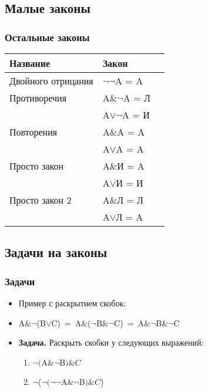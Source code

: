 \documentclass[compress,red]{beamer}
\begin{document}
\subsection{Малые законы}
\begin{frame}[fragile]
  \frametitle{Остальные законы}
  \begin{center}
  \begin{tabular}{|l|l|l|}
    \hline
    Название & Закон \\
    \hline
    Двойного отрицания & ${\neg{\neg}}$A = A \\ 
    \hline
    Противоречия & A$\&{\neg}$A = Л \\
                  & A$\vee{\neg}$A = И \\
    \hline
    Повторения & A$\&$A = A \\
               & A$\vee$A = A \\
    \hline
    Просто закон & A$\&$И = A \\
              & A$\vee$И = И \\
    \hline
    Просто закон 2 & A$\&$Л = Л \\
              & A$\vee$Л = A \\
    \hline
  \end{tabular}
  \end{center}
\end{frame}

\subsection{Задачи на законы}
\begin{frame}[fragile]
  \frametitle{Задачи}
  \begin{itemize}
    \item Пример с раскрытием скобок: 
    \item A$\&{\neg}$(B$\vee$C)~=~A$\&$(${\neg}$B$\&$${\neg}$C)~=~A$\&{\neg}$B$\&$${\neg}$C
    \item \textbf{Задача.} Раскрыть скобки у следующих выражений:
      \begin{enumerate}
        \item ${\neg} ($A$\&{\neg}$B$)\&C $
        \item ${\neg}$(${\neg} ({\neg}{\neg}$A$\&{\neg}$B$)\&C $)
      \end{enumerate}
  \end{itemize}
\end{frame}
\end{document}
